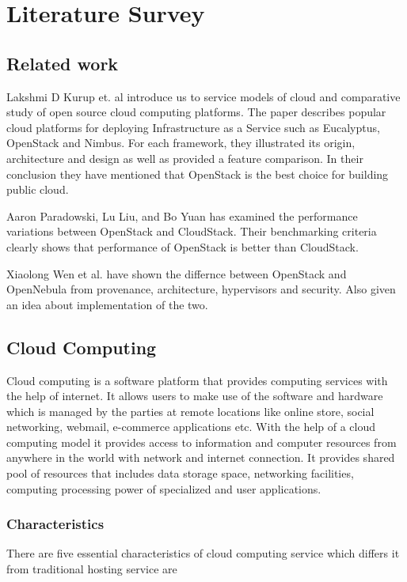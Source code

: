 \chapter{Literature Survey}
    \section{Related work}
    \par Lakshmi D Kurup et. al \cite{lakshmi} introduce us to service models of cloud and comparative study of open source cloud computing platforms. The paper describes popular cloud platforms for deploying Infrastructure as a Service such as Eucalyptus, OpenStack and Nimbus. For each framework, they illustrated its origin, architecture and design as well as provided a feature comparison. In their conclusion they have mentioned that OpenStack is the best choice for building public cloud.
    
    Aaron Paradowski, Lu Liu, and Bo Yuan\cite{cloudstack} has examined the performance variations between OpenStack and CloudStack. Their benchmarking criteria clearly shows that performance of OpenStack is better than CloudStack.
    
    Xiaolong Wen et al.\cite{opennebula} have shown the differnce between OpenStack and OpenNebula from provenance, architecture, hypervisors and security. Also given an idea about implementation of the two.

    \section{Cloud Computing}
    
    \par Cloud computing is a software platform that provides computing services with the help of internet. It allows users to make use of the software and hardware which is managed by the parties at remote locations like online store, social networking, webmail, e-commerce applications etc. With the help of a cloud computing model it provides access to information and computer resources from anywhere in the world with network and internet connection. It provides shared pool of resources that includes data storage space, networking facilities, computing processing power of specialized and user applications\cite{deploy}.%
    
    \subsection{Characteristics}
    There are five essential characteristics of cloud computing service which differs it from traditional hosting service are
    
